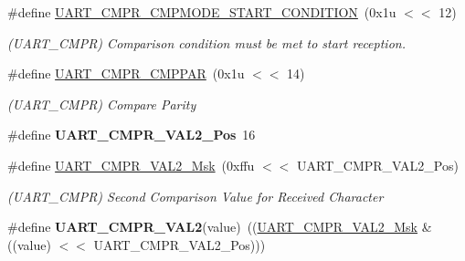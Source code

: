 \begin{DoxyCompactItemize}
\#define \mbox{\hyperlink{group__SAMS70__UART_ga150f46983b40fcaa87d327062197971b}{U\+A\+R\+T\+\_\+\+C\+M\+P\+R\+\_\+\+C\+M\+P\+M\+O\+D\+E\+\_\+\+S\+T\+A\+R\+T\+\_\+\+C\+O\+N\+D\+I\+T\+I\+ON}}~(0x1u $<$$<$ 12)
\begin{DoxyCompactList}\small\item\em (U\+A\+R\+T\+\_\+\+C\+M\+PR) Comparison condition must be met to start reception. \end{DoxyCompactList}\item 
\mbox{\label{group__SAMS70__UART_ga50794fcacde1aa94e918b04a8d9cf908}} 
\#define \mbox{\hyperlink{group__SAMS70__UART_ga50794fcacde1aa94e918b04a8d9cf908}{U\+A\+R\+T\+\_\+\+C\+M\+P\+R\+\_\+\+C\+M\+P\+P\+AR}}~(0x1u $<$$<$ 14)
\begin{DoxyCompactList}\small\item\em (U\+A\+R\+T\+\_\+\+C\+M\+PR) Compare Parity \end{DoxyCompactList}\item 
\mbox{\label{group__SAMS70__UART_ga4568462f5495dc5df8e7d02898ae36c5}} 
\#define {\bfseries U\+A\+R\+T\+\_\+\+C\+M\+P\+R\+\_\+\+V\+A\+L2\+\_\+\+Pos}~16
\item 
\mbox{\label{group__SAMS70__UART_gae17736fd7c755e474908a189301ef43e}} 
\#define \mbox{\hyperlink{group__SAMS70__UART_gae17736fd7c755e474908a189301ef43e}{U\+A\+R\+T\+\_\+\+C\+M\+P\+R\+\_\+\+V\+A\+L2\+\_\+\+Msk}}~(0xffu $<$$<$ U\+A\+R\+T\+\_\+\+C\+M\+P\+R\+\_\+\+V\+A\+L2\+\_\+\+Pos)
\begin{DoxyCompactList}\small\item\em (U\+A\+R\+T\+\_\+\+C\+M\+PR) Second Comparison Value for Received Character \end{DoxyCompactList}\item 
\mbox{\label{group__SAMS70__UART_ga18039981fbf277f8316cd92256980dfd}} 
\#define {\bfseries U\+A\+R\+T\+\_\+\+C\+M\+P\+R\+\_\+\+V\+A\+L2}(value)~((\mbox{\hyperlink{group__SAMV71__UART_gae17736fd7c755e474908a189301ef43e}{U\+A\+R\+T\+\_\+\+C\+M\+P\+R\+\_\+\+V\+A\+L2\+\_\+\+Msk}} \& ((value) $<$$<$ U\+A\+R\+T\+\_\+\+C\+M\+P\+R\+\_\+\+V\+A\+L2\+\_\+\+Pos)))
\item 
\mbox{\label{group__SAMS70__UART_gab930e465c6acf9e610bd01ebb4bf6668}} 

\end{DoxyCompactItemize}
